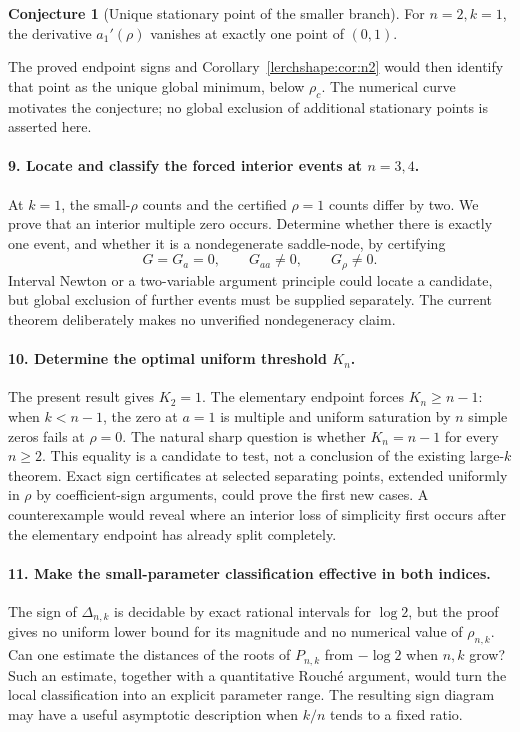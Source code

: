 \documentclass[11pt,a4paper]{article}
\theoremstyle{definition}
\newtheorem{conjecture}[theorem]{Conjecture}
\theoremstyle{remark}
\numberwithin{equation}{section}
\begin{document}
\begin{conjecture}[Unique stationary point of the smaller branch]
\label{research:conj:minimum}
For $n=2,k=1$, the derivative $a_1'(\rho)$ vanishes at exactly one
point of $(0,1)$.
\end{conjecture}
The proved endpoint signs and Corollary~\ref{lerchshape:cor:n2}
would then identify that point as the unique global minimum, below
$\rho_c$. The numerical curve motivates the conjecture; no global
exclusion of additional stationary points is asserted here.

\paragraph{9. Locate and classify the forced interior events at $n=3,4$.}
At $k=1$, the small-$\rho$ counts and the certified $\rho=1$ counts
differ by two. We prove that an interior multiple zero occurs.
Determine whether there is exactly one event, and whether it is a
nondegenerate saddle-node, by certifying
\[
G=G_a=0,\qquad G_{aa}\ne0,\qquad G_\rho\ne0.
\]
Interval Newton or a two-variable argument principle could locate a
candidate, but global exclusion of further events must be supplied
separately. The current theorem deliberately makes no unverified
nondegeneracy claim.

\paragraph{10. Determine the optimal uniform threshold $K_n$.}
The present result gives $K_2=1$. The elementary endpoint forces
$K_n\geq n-1$: when $k<n-1$, the zero at $a=1$ is multiple and
uniform saturation by $n$ simple zeros fails at $\rho=0$.
The natural sharp question is whether $K_n=n-1$ for every $n\geq2$.
This equality is a candidate to test, not a conclusion of the existing
large-$k$ theorem. Exact sign certificates at selected separating
points, extended uniformly in $\rho$ by coefficient-sign arguments,
could prove the first new cases. A counterexample would reveal where
an interior loss of simplicity first occurs after the elementary
endpoint has already split completely.

\paragraph{11. Make the small-parameter classification effective in both indices.}
The sign of $\Delta_{n,k}$ is decidable by exact rational intervals
for $\log2$, but the proof gives no uniform lower bound for its
magnitude and no numerical value of $\rho_{n,k}$. Can one estimate
the distances of the roots of $P_{n,k}$ from $-\log2$ when $n,k$
grow? Such an estimate, together with a quantitative Rouché argument,
would turn the local classification into an explicit parameter range.
The resulting sign diagram may have a useful asymptotic description
when $k/n$ tends to a fixed ratio.
\end{document}
